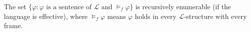 The set $\{ \varphi : \varphi \text{ is a sentence of } \mathcal{L} \text{ and } \models_f \varphi \}$ is recursively enumerable (if the language is effective), where $\models_f \varphi$ means $\varphi$ holds in every $\mathcal{L}$-structure with every frame.

